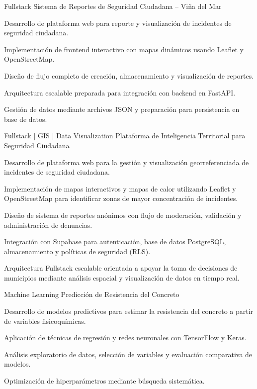 \begin{cventries}
\cventry
  {Fullstack}
  {Sistema de Reportes de Seguridad Ciudadana – Viña del Mar}
  {}
  {}
  {
    \begin{cvitems}
      \item {Desarrollo de plataforma web para reporte y visualización de incidentes de seguridad ciudadana.}
      \item {Implementación de frontend interactivo con mapas dinámicos usando Leaflet y OpenStreetMap.}
      \item {Diseño de flujo completo de creación, almacenamiento y visualización de reportes.}
      \item {Arquitectura escalable preparada para integración con backend en FastAPI.}
      \item {Gestión de datos mediante archivos JSON y preparación para persistencia en base de datos.}
    \end{cvitems}
    \vspace{5mm}
  }
\cventry
  {Fullstack | GIS | Data Visualization}
  {Plataforma de Inteligencia Territorial para Seguridad Ciudadana}
  {}
  {}
  {
    \begin{cvitems}
      \item {Desarrollo de plataforma web para la gestión y visualización georreferenciada de incidentes de seguridad ciudadana.}
      \item {Implementación de mapas interactivos y mapas de calor utilizando Leaflet y OpenStreetMap para identificar zonas de mayor concentración de incidentes.}
      \item {Diseño de sistema de reportes anónimos con flujo de moderación, validación y administración de denuncias.}
      \item {Integración con Supabase para autenticación, base de datos PostgreSQL, almacenamiento y políticas de seguridad (RLS).}
      \item {Arquitectura Fullstack escalable orientada a apoyar la toma de decisiones de municipios mediante análisis espacial y visualización de datos en tiempo real.}
    \end{cvitems}
    \vspace{5mm}
  }
\cventry
  {Machine Learning}
  {Predicción de Resistencia del Concreto}
  {}
  {}
  {
    \begin{cvitems}
      \item {Desarrollo de modelos predictivos para estimar la resistencia del concreto a partir de variables fisicoquímicas.}
      \item {Aplicación de técnicas de regresión y redes neuronales con TensorFlow y Keras.}
      \item {Análisis exploratorio de datos, selección de variables y evaluación comparativa de modelos.}
      \item {Optimización de hiperparámetros mediante búsqueda sistemática.}
    \end{cvitems}
    \vspace{5mm}
  }


\end{cventries}
